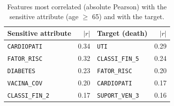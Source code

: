 \begin{table}
  \small
  \caption{Features most correlated (absolute Pearson) with the sensitive attribute (age $\geq$ 65) and with the target.}
  \label{tab:proxy-correlations}
  \begin{tabular}{lrlr}
    \toprule
    Sensitive attribute & $|r|$ & Target (death) & $|r|$ \\
    \midrule
    \texttt{CARDIOPATI} & 0.34 & \texttt{UTI} & 0.29 \\
    \texttt{FATOR\_RISC} & 0.32 & \texttt{CLASSI\_FIN\_5} & 0.24 \\
    \texttt{DIABETES} & 0.23 & \texttt{FATOR\_RISC} & 0.20 \\
    \texttt{VACINA\_COV} & 0.20 & \texttt{CARDIOPATI} & 0.17 \\
    \texttt{CLASSI\_FIN\_2} & 0.17 & \texttt{SUPORT\_VEN\_3} & 0.16 \\
    \bottomrule
  \end{tabular}
\end{table}
